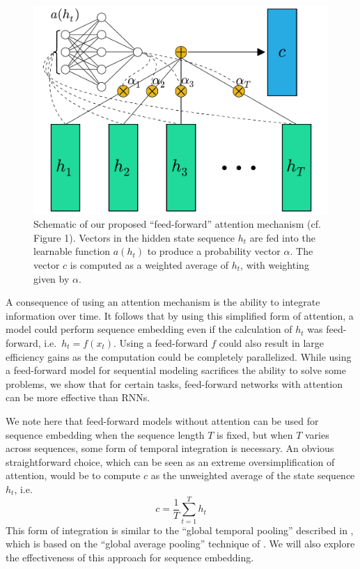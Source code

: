 \documentclass{article} %
\begin{document}
\begin{figure}
  \centering
  \includegraphics[width=.8\textwidth]{schematic.pdf}
  \caption{Schematic of our proposed ``feed-forward'' attention mechanism (cf.\ \cite{cho2015introduction} Figure 1).  Vectors in the hidden state sequence $h_t$ are fed into the learnable function $a(h_t)$ to produce a probability vector $\alpha$.  The vector $c$ is computed as a weighted average of $h_t$, with weighting given by $\alpha$.}
  \label{fig:schematic}
\end{figure}


A consequence of using an attention mechanism is the ability to integrate information over time.
It follows that by using this simplified form of attention, a model could perform sequence embedding even if the calculation of $h_t$ was feed-forward, i.e.\ $h_t = f(x_t)$.
Using a feed-forward $f$ could also result in large efficiency gains as the computation could be completely parallelized.
While using a feed-forward model for sequential modeling sacrifices the ability to solve some problems, we show that for certain tasks, feed-forward networks with attention can be more effective than RNNs.

We note here that feed-forward models without attention can be used for sequence embedding when the sequence length $T$ is fixed, but when $T$ varies across sequences, some form of temporal integration is necessary.
An obvious straightforward choice, which can be seen as an extreme oversimplification of attention, would be to compute $c$ as the unweighted average of the state sequence $h_t$, i.e.
\begin{equation}
\label{eq:unweighted}
c = \frac{1}{T}\sum_{t = 1}^T h_t
\end{equation}
This form of integration is similar to the ``global temporal pooling'' described in \cite{dieleman2014recommending}, which is based on the ``global average pooling'' technique of \cite{lin2014network}.
We will also explore the effectiveness of this approach for sequence embedding.
\end{document}
